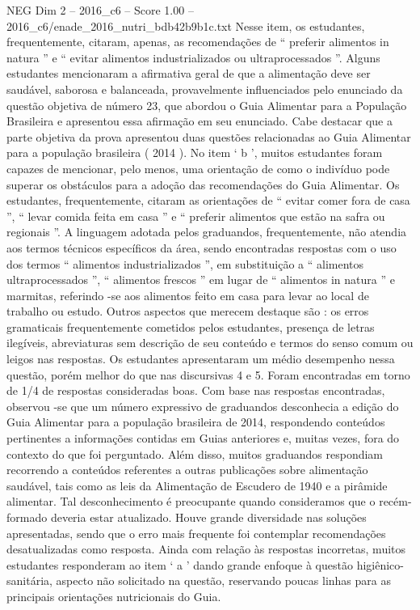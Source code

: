 \begin{textsample}{NEG Dim 2 – 2016\_c6 – Score 1.00 – 2016\_c6/enade\_2016\_nutri\_bdb42b9b1c.txt}
Nesse item, os estudantes, frequentemente, citaram, apenas, as recomendações de “ preferir alimentos in natura ” e “ evitar alimentos industrializados ou ultraprocessados ”.
Alguns estudantes mencionaram a afirmativa geral de que a alimentação deve ser saudável, saborosa e balanceada, provavelmente influenciados pelo enunciado da questão objetiva de número 23, que abordou o Guia Alimentar para a População Brasileira e apresentou essa afirmação em seu enunciado.
Cabe destacar que a parte objetiva da prova apresentou duas questões relacionadas ao Guia Alimentar para a população brasileira ( 2014 ).
No item ‘ b ’, muitos estudantes foram capazes de mencionar, pelo menos, uma orientação de como o indivíduo pode superar os obstáculos para a adoção das recomendações do Guia Alimentar.
Os estudantes, frequentemente, citaram as orientações de “ evitar comer fora de casa ”, “ levar comida feita em casa ” e “ preferir alimentos que estão na safra ou regionais ”.
A linguagem adotada pelos graduandos, frequentemente, não atendia aos termos técnicos específicos da área, sendo encontradas respostas com o uso dos termos “ alimentos industrializados ”, em substituição a “ alimentos ultraprocessados ”, “ alimentos frescos ” em lugar de “ alimentos in natura ” e marmitas, referindo -se aos alimentos feito em casa para levar ao local de trabalho ou estudo.
Outros aspectos que merecem destaque são : os erros gramaticais frequentemente cometidos pelos estudantes, presença de letras ilegíveis, abreviaturas sem descrição de seu conteúdo e termos do senso comum ou leigos nas respostas.
Os estudantes apresentaram um médio desempenho nessa questão, porém melhor do que nas discursivas 4 e 5.
Foram encontradas em torno de 1/4 de respostas consideradas boas.
Com base nas respostas encontradas, observou -se que um número expressivo de graduandos desconhecia a edição do Guia Alimentar para a população brasileira de 2014, respondendo conteúdos pertinentes a informações contidas em Guias anteriores e, muitas vezes, fora do contexto do que foi perguntado.
Além disso, muitos graduandos respondiam recorrendo a conteúdos referentes a outras publicações sobre alimentação saudável, tais como as leis da Alimentação de Escudero de 1940 e a pirâmide alimentar.
Tal desconhecimento é preocupante quando consideramos que o recém-formado deveria estar atualizado.
Houve grande diversidade nas soluções apresentadas, sendo que o erro mais frequente foi contemplar recomendações desatualizadas como resposta.
Ainda com relação às respostas incorretas, muitos estudantes responderam ao item ‘ a ’ dando grande enfoque à questão higiênico-sanitária, aspecto não solicitado na questão, reservando poucas linhas para as principais orientações nutricionais do Guia.

\end{textsample}
